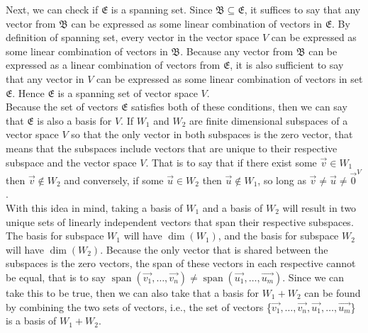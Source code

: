 \documentclass{report}
\begin{document}
\noindent Next, we can check if $\mathfrak{E}$ is a spanning set. Since $\mathfrak{B}\subseteq\mathfrak{E}$, it suffices to say that any vector from $\mathfrak{B}$ can be expressed as some linear combination of vectors in $\mathfrak{E}$. By definition of spanning set, every vector in the vector space $V$ can be expressed as some linear combination of vectors in $\mathfrak{B}$. Because any vector from $\mathfrak{B}$ can be expressed as a linear combination of vectors from $\mathfrak{E}$, it is also sufficient to say that any vector in $V$ can be expressed as some linear combination of vectors in set $\mathfrak{E}$. Hence $\mathfrak{E}$ is a spanning set of vector space $V$. \\

\noindent Because the set of vectors $\mathfrak{E}$ satisfies both of these conditions, then we can say that $\mathfrak{E}$ is also a basis for $V$.
\sol If $W_1$ and $W_2$ are finite dimensional subspaces of a vector space $V$ so that the only vector in both subspaces is the zero vector, that means that the subspaces include vectors that are unique to their respective subspace and the vector space $V$. That is to say that if there exist some $\vec{v}\in W_1$ then $\vec{v}\notin W_2$ and conversely, if some $\vec{u}\in W_2$ then $\vec{u}\notin W_1$, so long as $\vec{v}\neq\vec{u}\neq\vec{0}^V$. \\

\noindent With this idea in mind, taking a basis of $W_1$ and a basis of $W_2$ will result in two unique sets of linearly independent vectors that span their respective subspaces. The basis for subspace $W_1$ will have $\operatorname{dim}\left(W_1\right)$, and the basis for subspace $W_2$ will have $\operatorname{dim}\left(W_2\right)$. Because the only vector that is shared between the subspaces is the zero vectors, the span of these vectors in each respective cannot be equal, that is to say $\operatorname{span}(\vec{v_1}, \ldots, \vec{v_n}) \neq \operatorname{span}(\vec{u_1}, \dots, \vec{u_m})$. Since we can take this to be true, then we can also take that a basis for $W_1 + W_2$ can be found by combining the two sets of vectors, i.e., the set of vectors \{$\vec{v_1}, \ldots, \vec{v_n}, \vec{u_1}, \ldots, \vec{u_m}$\} is a basis of $W_1 + W_2$. \\
\end{document}
